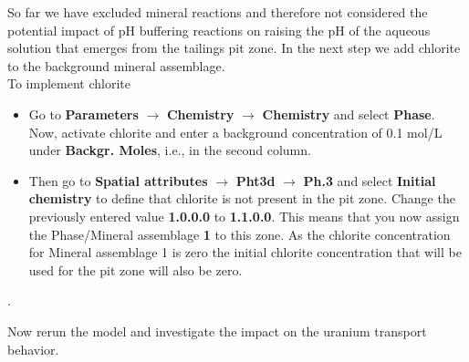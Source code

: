 So far we have excluded mineral reactions and therefore not considered 
the potential impact of pH buffering reactions on 
raising the pH of the aqueous solution that emerges from the 
tailings pit zone. In the next step we add chlorite to the 
background mineral assemblage. 
\\
To implement chlorite
\begin{itemize}
\item Go to 
{\color{blue}\textbf{Parameters}}
$\rightarrow$ {\color{blue}\textbf{Chemistry}} 
$\rightarrow$ {\color{blue}\textbf{Chemistry}}
and select {\color{blue}\textbf{Phase}}.
Now, activate chlorite and enter a background concentration
of 0.1 mol/L under {\color{blue}\textbf{Backgr. Moles}}, i.e., 
in the second column.
\item Then go to 
{\color{blue}\textbf{Spatial attributes}} 
$\rightarrow$ {\color{blue}\textbf{Pht3d}}
$\rightarrow$ {\color{blue}\textbf{Ph.3}}
and select {\color{blue}\textbf{Initial chemistry}} 
to define that chlorite is not present in the pit zone.
Change the previously entered value 
{\color{blue}\textbf{1.0.0.0}} to {\color{blue}\textbf{1.1.0.0}}.
This means that you now assign 
the Phase/Mineral assemblage {\color{blue}\textbf{1}}
to this zone. As the chlorite concentration for Mineral assemblage 1 is zero
the initial chlorite concentration that will be used for the pit zone
will also be zero.
\end{itemize}.

Now rerun the model and investigate the impact on the uranium transport behavior.


 
  





